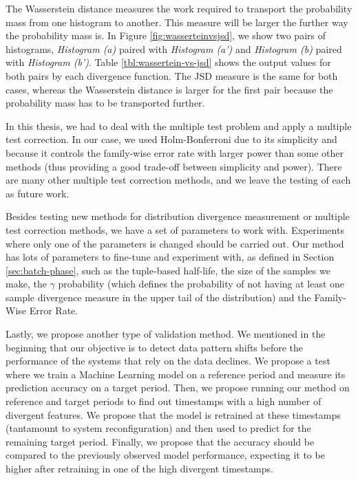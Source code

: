 The Wasserstein distance measures the work required to transport the probability mass from one histogram to another. This measure will be larger the further way the probability mass is. In Figure \ref{fig:wasserteinvsjsd}, we show two pairs of histograms, \textit{Histogram (a)} paired with \textit{Histogram (a')} and \textit{Histogram (b)} paired with \textit{Histogram (b')}. Table \ref{tbl:wassertein-vs-jsd} shows the output values for both pairs by each divergence function. The JSD measure is the same for both cases, whereas the Wasserstein distance is larger for the first pair because the probability mass has to be transported further.

In this thesis, we had to deal with the multiple test problem and apply a multiple test correction. In our case, we used Holm-Bonferroni due to its simplicity and because it controls the family-wise error rate with larger power than some other methods (thus providing a good trade-off between simplicity and power). There are many other multiple test correction methods, and we leave the testing of each as future work.

Besides testing new methods for distribution divergence measurement or multiple test correction methods, we have a set of parameters to work with. Experiments where only one of the parameters is changed should be carried out. Our method has lots of parameters to fine-tune and experiment with, as defined in Section \ref{sec:batch-phase}, such as the tuple-based half-life, the size of the samples we make, the $\gamma$ probability (which defines the probability of not having at least one sample divergence measure in the upper tail of the distribution) and the Family-Wise Error Rate.

Lastly, we propose another type of validation method. We mentioned in the beginning that our objective is to detect data pattern shifts before the performance of the systems that rely on the data declines. We propose a test where we train a Machine Learning model on a reference period and measure its prediction accuracy on a target period. Then, we propose running our method on reference and target periods to find out timestamps with a high number of divergent features. We propose that the model is retrained at these timestamps (tantamount to system reconfiguration) and then used to predict for the remaining target period. Finally, we propose that the accuracy should be compared to the previously observed model performance, expecting it to be higher after retraining in one of the high divergent timestamps.
